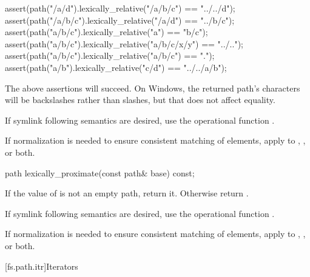 \begin{itemdescr}
\pnum
\begin{example}
\begin{codeblock}
assert(path("/a/d").lexically_relative("/a/b/c") == "../../d");
assert(path("/a/b/c").lexically_relative("/a/d") == "../b/c");
assert(path("a/b/c").lexically_relative("a") == "b/c");
assert(path("a/b/c").lexically_relative("a/b/c/x/y") == "../..");
assert(path("a/b/c").lexically_relative("a/b/c") == ".");
assert(path("a/b").lexically_relative("c/d") == "../../a/b");
\end{codeblock}
The above assertions will succeed.
On Windows, the returned path's  characters
will be backslashes rather than slashes,
but that does not affect  equality.
\end{example}

\pnum
\begin{note}
If symlink following semantics are desired,
  use the operational function .
\end{note}

\pnum
\begin{note}
If normalization is needed
  to ensure consistent matching of elements,
  apply  to
  , , or both.
\end{note}
\end{itemdescr}

%
\begin{itemdecl}
path lexically_proximate(const path& base) const;
\end{itemdecl}

\begin{itemdescr}
\pnum
\returns
If the value of  is not an empty path,
  return it. Otherwise return .

\pnum
\begin{note}
If symlink following semantics are desired,
  use the operational function .
\end{note}

\pnum
\begin{note}
If normalization is needed
  to ensure consistent matching of elements,
  apply  to
  , , or both.
\end{note}
\end{itemdescr}

[fs.path.itr]{Iterators}

